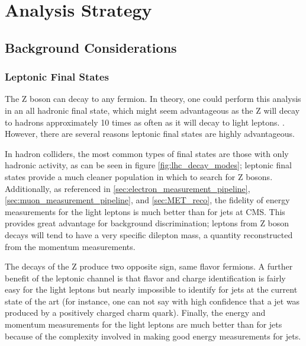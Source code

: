 \section{Analysis Strategy}

  \subsection{Background Considerations}

    \subsubsection{Leptonic Final States} \label{sec:leptonic_final_states}
      The Z boson can decay to any fermion. In theory, one could perform this analysis in an all hadronic final state, which might seem advantageous as the Z will decay to hadrons approximately 10 times as often as it will decay to light leptons. . However, there are several reasons leptonic final states are highly advantageous.

      In hadron colliders, the most common types of final states are those with only hadronic activity, as can be seen in figure \ref{fig:lhc_decay_modes}; leptonic final states provide a much cleaner population in which to search for Z bosons. Additionally, as referenced in \ref{sec:electron_measurement_pipeline}, \ref{sec:muon_measurement_pipeline}, and \ref{sec:MET_reco}, the fidelity of energy measurements for the light leptons is much better than for jets at CMS. This provides great advantage for background discrimination; leptons from Z boson decays will tend to have a very specific dilepton mass, a quantity reconstructed from the momentum measurements.

      The decays of the Z produce two opposite sign, same flavor fermions. A further benefit of the leptonic channel is that flavor and charge identification is fairly easy for the light leptons but nearly impossible to identify for jets at the current state of the art (for instance, one can not say with high confidence that a jet was produced by a positively charged charm quark). Finally, the energy and momentum measurements for the light leptons are much better than for jets because of the complexity involved in making good energy measurements for jets.  


